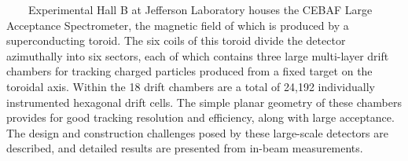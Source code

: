 \abstract

{\ \ \ \ Experimental Hall B at Jefferson Laboratory houses the CEBAF Large
Acceptance Spectrometer, the magnetic field of which is produced by a
superconducting toroid.  The six coils of this toroid divide the detector
azimuthally into six sectors, each of which contains three large multi-layer 
drift chambers for tracking charged particles produced from a fixed target on 
the toroidal axis.  Within the 18 drift chambers are a total of 24,192 
individually instrumented hexagonal drift cells.  The simple planar 
geometry of these chambers provides for good tracking resolution and 
efficiency, along with large acceptance. The design and construction 
challenges posed by these large-scale detectors are described, and detailed 
results are presented from in-beam measurements.}




